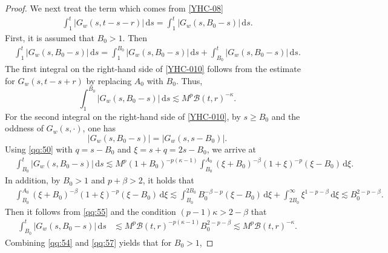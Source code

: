 \documentclass[10pt,a4paper]{amsart}
\newcommand{\Bcal}{\mathcal B}
\newcommand{\dd}{\,\mathrm{d}}
\begin{document}
\begin{proof}
We next treat the term which comes from \eqref{YHC-08}
\begin{equation}\label{YHC-011}
\begin{aligned}
\int_1^t
|G_w(s,t-s-r)|\dd s
=
\int_1^t
|G_w(s,B_0-s)|\dd s.
\end{aligned}
\end{equation}
First, it is assumed that $B_0>1$. Then
\begin{equation}\label{YHC-010}
\begin{aligned}
\int_1^t
|G_w(s,B_0-s)|\dd s
=
\int_1^{B_0}
|G_w(s,B_0-s)|\dd s
+
\int_{B_0}^{t}
|G_w(s,B_0-s)|\dd s .
\end{aligned}
\end{equation}
The first integral on the right-hand side of \eqref{YHC-010} follows from the estimate for
$G_w(s,t-s+r)$ by replacing $A_0$ with $B_0$. Thus,
\begin{equation}
\label{qq:54}
\int_1^{B_0}
|G_w(s,B_0-s)|\dd s
\lesssim
M^p\Bcal(t,r)^{-\kappa}.
\end{equation}
For the second integral on the right-hand side of \eqref{YHC-010}, by $s\geq B_0$ and the oddness of
$G_w(s,\cdot)$, one has
\[
|G_w(s,B_0-s)|
=|G_w(s,s-B_0)|.
\]
Using \eqref{qq:50} with
$q=s-B_0$ and $\xi=s+q=2s-B_0$, we arrive at
\begin{equation}
\label{qq:55}
\begin{aligned}
&\int_{B_0}^{t}
|G_w(s,B_0-s)|\dd s\lesssim
M^p(1+B_0)^{-p(\kappa-1)}
\int_{B_0}^{A_0}
(\xi+B_0)^{-\beta}
(1+\xi)^{-p}
(\xi-B_0)\dd\xi.
\end{aligned}
\end{equation}
In addition, by $B_0>1$ and $p+\beta>2$, it holds that
\begin{equation}
\label{qq:56}
\begin{aligned}
&\int_{B_0}^{A_0}
(\xi+B_0)^{-\beta}
(1+\xi)^{-p}
(\xi-B_0)\dd\xi\lesssim
\int_{B_0}^{2B_0}
B_0^{-\beta-p}
(\xi-B_0)\dd\xi
+\int_{2B_0}^{\infty}
\xi^{1-p-\beta}\dd\xi\lesssim
B_0^{2-p-\beta}.
\end{aligned}
\end{equation}
Then it follows from \eqref{qq:55} and the condition $(p-1)\kappa>2-\beta$ that
\begin{equation}
\label{qq:57}
\begin{aligned}
\int_{B_0}^{t}
|G_w(s,B_0-s)|\dd s
&\lesssim
M^p
\Bcal(t,r)^{-p(\kappa-1)}
B_0^{2-p-\beta}\lesssim
M^p\Bcal(t,r)^{-\kappa}.
\end{aligned}
\end{equation}
Combining \eqref{qq:54} and \eqref{qq:57} yields that for $B_0>1$,

\end{proof}
\end{document}
